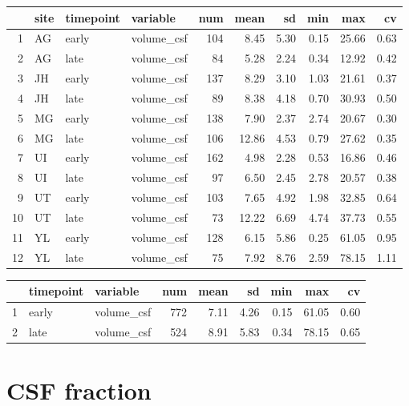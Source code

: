 \documentclass[
]{article}
\begin{document}
\begin{table}[ht]
\centering
\begin{tabular}{rlllrrrrrr}
  \hline
 & site & timepoint & variable & num & mean & sd & min & max & cv \\ 
  \hline
1 & AG & early & volume\_csf & 104 & 8.45 & 5.30 & 0.15 & 25.66 & 0.63 \\ 
  2 & AG & late & volume\_csf &  84 & 5.28 & 2.24 & 0.34 & 12.92 & 0.42 \\ 
  3 & JH & early & volume\_csf & 137 & 8.29 & 3.10 & 1.03 & 21.61 & 0.37 \\ 
  4 & JH & late & volume\_csf &  89 & 8.38 & 4.18 & 0.70 & 30.93 & 0.50 \\ 
  5 & MG & early & volume\_csf & 138 & 7.90 & 2.37 & 2.74 & 20.67 & 0.30 \\ 
  6 & MG & late & volume\_csf & 106 & 12.86 & 4.53 & 0.79 & 27.62 & 0.35 \\ 
  7 & UI & early & volume\_csf & 162 & 4.98 & 2.28 & 0.53 & 16.86 & 0.46 \\ 
  8 & UI & late & volume\_csf &  97 & 6.50 & 2.45 & 2.78 & 20.57 & 0.38 \\ 
  9 & UT & early & volume\_csf & 103 & 7.65 & 4.92 & 1.98 & 32.85 & 0.64 \\ 
  10 & UT & late & volume\_csf &  73 & 12.22 & 6.69 & 4.74 & 37.73 & 0.55 \\ 
  11 & YL & early & volume\_csf & 128 & 6.15 & 5.86 & 0.25 & 61.05 & 0.95 \\ 
  12 & YL & late & volume\_csf &  75 & 7.92 & 8.76 & 2.59 & 78.15 & 1.11 \\ 
   \hline
\end{tabular}
\end{table}
\begin{table}[ht]
\centering
\begin{tabular}{rllrrrrrr}
  \hline
 & timepoint & variable & num & mean & sd & min & max & cv \\ 
  \hline
1 & early & volume\_csf & 772 & 7.11 & 4.26 & 0.15 & 61.05 & 0.60 \\ 
  2 & late & volume\_csf & 524 & 8.91 & 5.83 & 0.34 & 78.15 & 0.65 \\ 
   \hline
\end{tabular}
\end{table}

\hypertarget{csf-fraction}{%
\section{CSF fraction}\label{csf-fraction}}
\end{document}
